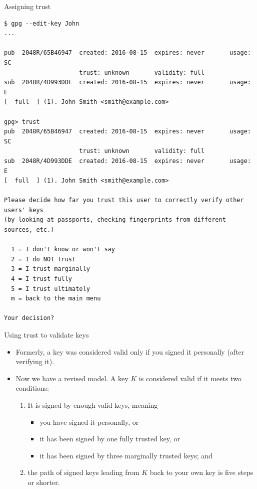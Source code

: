 \documentclass[
mode=present,
paper=smartboard,
size=20pt,
]{powerdot}
\begin{document}
\makeatletter\renewcommand{\verbatim@font}{\scriptsize\tt}\makeatother
\begin{slide}[method=direct]{Assigning trust}
\vspace{-10mm}
\begin{verbatim}
$ gpg --edit-key John
...

pub  2048R/65B46947  created: 2016-08-15  expires: never       usage: SC  
                     trust: unknown       validity: full
sub  2048R/4D993DDE  created: 2016-08-15  expires: never       usage: E   
[  full  ] (1). John Smith <smith@example.com>

gpg> trust
pub  2048R/65B46947  created: 2016-08-15  expires: never       usage: SC  
                     trust: unknown       validity: full
sub  2048R/4D993DDE  created: 2016-08-15  expires: never       usage: E   
[  full  ] (1). John Smith <smith@example.com>

Please decide how far you trust this user to correctly verify other users' keys
(by looking at passports, checking fingerprints from different sources, etc.)

  1 = I don't know or won't say
  2 = I do NOT trust
  3 = I trust marginally
  4 = I trust fully
  5 = I trust ultimately
  m = back to the main menu

Your decision?
\end{verbatim}
\end{slide}

\begin{slide}{Using trust to validate keys}
  \begin{itemize}
  \item Formerly, a key was considered valid only if you signed it
    personally (after verifying it).
  \item Now we have a revised model.  A key $K$ is considered valid if
    it meets two conditions:
    \begin{enumerate}
    \item It is signed by enough valid keys, meaning
      \begin{itemize}
      \item you have signed it personally, or
      \item it has been signed by one fully trusted key, or
      \item it has been signed by three marginally trusted keys; and
      \end{itemize}
    \item the path of signed keys leading from $K$ back to your own
      key is five steps or shorter.
    \end{enumerate}
  \end{itemize}
\end{slide}
\end{document}
